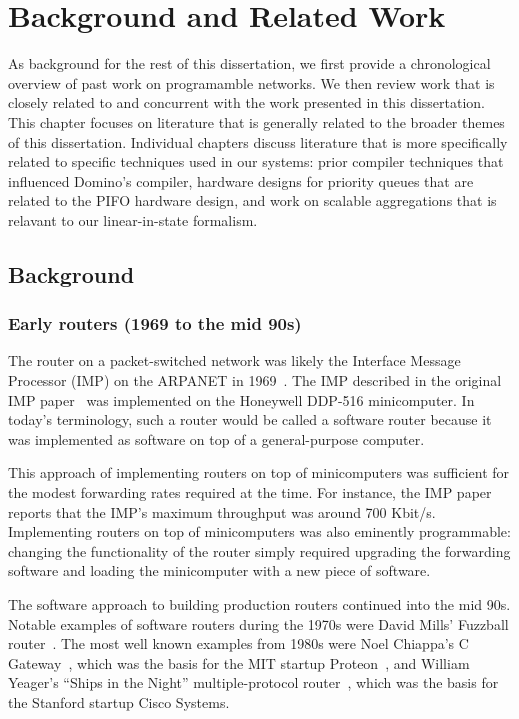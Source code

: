 \chapter{Background and Related Work}
\label{chap:related}

As background for the rest of this dissertation, we first provide a
chronological overview of past work on programamble networks. We then review
work that is closely related to and concurrent with the work presented in this
dissertation. This chapter focuses on literature that is generally related to
the broader themes of this dissertation. Individual chapters discuss literature
that is more specifically related to specific techniques used in our systems:
prior compiler techniques that influenced Domino's compiler, hardware designs
for priority queues that are related to the PIFO hardware design, and work on
scalable aggregations that is relavant to our linear-in-state formalism.

\section{Background}
\subsection{Early routers (1969 to the mid 90s)}
The router on a packet-switched network was likely the Interface Message
Processor (IMP) on the ARPANET in 1969~\cite{imp}. The IMP described in the
original IMP paper~\cite{imp} was implemented on the Honeywell DDP-516
minicomputer. In today's terminology, such a router would be called a software
router because it was implemented as software on top of a general-purpose
computer.

This approach of implementing routers on top of minicomputers was sufficient
for the modest forwarding rates required at the time. For instance, the IMP
paper reports that the IMP's maximum throughput was around 700 Kbit/s.
Implementing routers on top of minicomputers was also eminently programmable:
changing the functionality of the router simply required upgrading the
forwarding software and loading the minicomputer with a new piece of software.

The software approach to building production routers continued into the mid
90s.  Notable examples of software routers during the 1970s were David Mills'
Fuzzball router~\cite{fuzzball}. The most well known examples from 1980s were
Noel Chiappa's C Gateway~\cite{cgw}, which was the basis for the MIT startup
Proteon~\cite{proteon}, and William Yeager's ``Ships in the Night''
multiple-protocol router~\cite{ships}, which was the basis for the Stanford
startup Cisco Systems.

